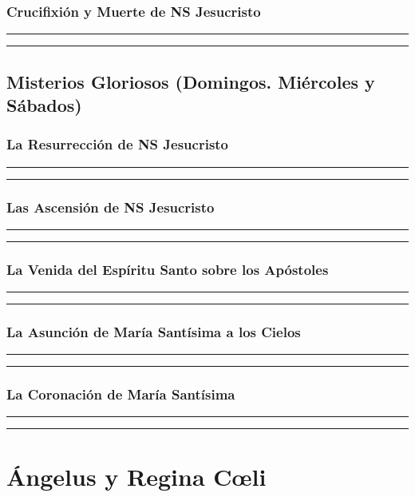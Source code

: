 \documentclass[11pt,a4paper]{report}
\begin{document}
\subsubsection*{Crucifixión y Muerte de NS Jesucristo}


\rule{\textwidth}{0.5pt}

\rule{\textwidth}{0.5pt}


\subsection*{Misterios Gloriosos (Domingos. Miércoles y Sábados)}

\subsubsection*{La Resurrección de NS Jesucristo}

\rule{\textwidth}{0.5pt}

\rule{\textwidth}{0.5pt}


\subsubsection*{Las Ascensión de NS Jesucristo}


\rule{\textwidth}{0.5pt}

\rule{\textwidth}{0.5pt}

\subsubsection*{La Venida del Espíritu Santo sobre los Apóstoles}


\rule{\textwidth}{0.5pt}

\rule{\textwidth}{0.5pt}


\subsubsection*{La Asunción de María Santísima a los Cielos}


\rule{\textwidth}{0.5pt}

\rule{\textwidth}{0.5pt}


\subsubsection*{La Coronación de María Santísima}


\rule{\textwidth}{0.5pt}

\rule{\textwidth}{0.5pt}


\section*{Ángelus y Regina Cœli}

\end{document}
